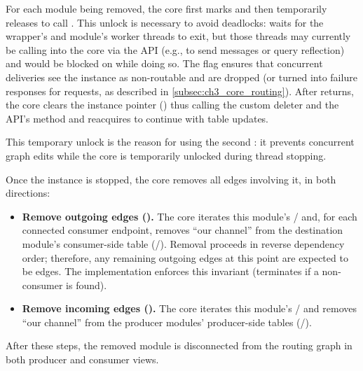 For each module being removed, the core first marks  and then temporarily releases  to call .
This unlock is necessary to avoid deadlocks:  waits for the wrapper's and module's worker threads to exit, but those threads may currently be calling into the core via the  API (e.g., to send messages or query reflection) and would be blocked on  while doing so.
The  flag ensures that concurrent deliveries see the instance as non-routable and are dropped (or turned into failure responses for requests, as described in \autoref{subsec:ch3_core_routing}).
After  returns, the core clears the instance pointer () thus calling the custom deleter and the API's  method and reacquires  to continue with table updates. 

This temporary unlock is the reason for using the second : it prevents concurrent graph edits while the core is temporarily unlocked during thread stopping.


Once the instance is stopped, the core removes all edges involving it, in both directions:
\begin{itemize}
    \item \textbf{Remove outgoing edges ().}
    The core iterates this module's / and, for each connected consumer endpoint, removes ``our channel'' from the destination module's consumer-side table (/).
    Removal proceeds in reverse dependency order; therefore, any remaining outgoing edges at this point are expected to be  edges. The implementation enforces this invariant (terminates if a non- consumer is found).
    \item \textbf{Remove incoming edges ().}
    The core iterates this module's / and removes ``our channel'' from the producer modules' producer-side tables (/).
\end{itemize}
After these steps, the removed module is disconnected from the routing graph in both producer and consumer views.

